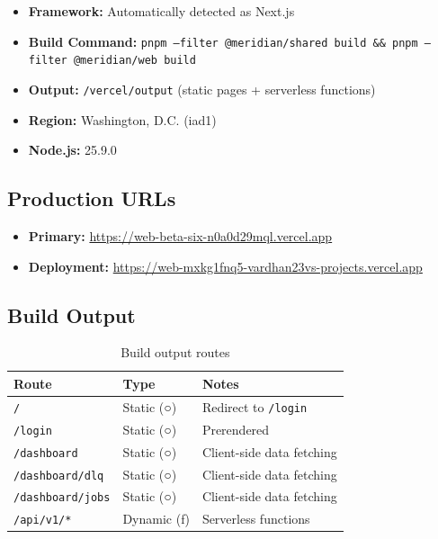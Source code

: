 \documentclass[12pt,a4paper]{article}
\begin{document}
\begin{itemize}[leftmargin=2em]
  \item \textbf{Framework:} Automatically detected as Next.js
  \item \textbf{Build Command:} \texttt{pnpm --filter @meridian/shared build \&\& pnpm --filter @meridian/web build}
  \item \textbf{Output:} \texttt{/vercel/output} (static pages + serverless functions)
  \item \textbf{Region:} Washington, D.C. (iad1)
  \item \textbf{Node.js:} 25.9.0
\end{itemize}

\subsection{Production URLs}

\begin{itemize}[leftmargin=2em]
  \item \textbf{Primary:} \url{https://web-beta-six-n0a0d29mql.vercel.app}
  \item \textbf{Deployment:} \url{https://web-mxkg1fnq5-vardhan23vs-projects.vercel.app}
\end{itemize}

\subsection{Build Output}

\begin{table}[H]
\centering
\begin{tabularx}{\textwidth}{llX}
\toprule
\textbf{Route} & \textbf{Type} & \textbf{Notes} \\
\midrule
\texttt{/}              & Static (○) & Redirect to \texttt{/login} \\
\texttt{/login}         & Static (○) & Prerendered \\
\texttt{/dashboard}     & Static (○) & Client-side data fetching \\
\texttt{/dashboard/dlq} & Static (○) & Client-side data fetching \\
\texttt{/dashboard/jobs} & Static (○) & Client-side data fetching \\
\texttt{/api/v1/*}      & Dynamic (ƒ) & Serverless functions \\
\bottomrule
\end{tabularx}
\caption{Build output routes}
\end{table}
\end{document}
